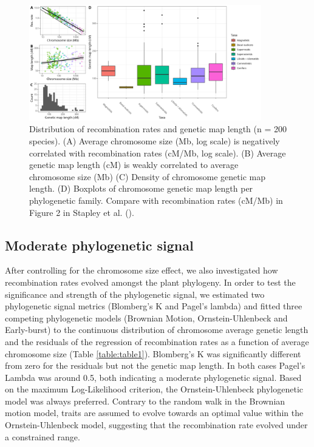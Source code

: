 \documentclass{article}
\begin{document}
\begin{figure}[h!]
  \includegraphics[width=0.9\textwidth]{figures/Fig1.jpeg}
  \centering
  \caption{Distribution of recombination rates and genetic map length  (n = 200 species). (A) Average chromosome size (Mb, log scale) is negatively correlated with recombination rates (cM/Mb, log scale). (B) Average genetic map length (cM) is weakly correlated to average chromosome size (Mb) (C) Density of chromosome genetic map length. (D) Boxplots of chromosome genetic map length per phylogenetic family. Compare with recombination rates (cM/Mb) in Figure 2 in Stapley et al. (\citeyear{stapleyVariationRecombinationFrequency2017}).
  }
  \label{figure:Fig1}
\end{figure}


\subsection*{Moderate phylogenetic signal}


After controlling for the chromosome size effect, we also investigated how recombination rates evolved amongst the plant phylogeny. In order to test the significance and strength of the phylogenetic signal, we estimated two phylogenetic signal metrics (Blomberg’s K and Pagel’s lambda) and fitted three competing phylogenetic models (Brownian Motion, Ornstein-Uhlenbeck and Early-burst) to the continuous distribution of chromosome average genetic length and the residuals of the regression of recombination rates as a function of average chromosome size (Table \ref{table:table1}). Blomberg's K was significantly different from zero for the residuals but not the genetic map length. In both cases Pagel's Lambda was around 0.5, both indicating a moderate phylogenetic signal. Based on the maximum Log-Likelihood criterion, the Ornstein-Uhlenbeck phylogenetic model was always preferred. Contrary to the random walk in the Brownian motion model, traits are assumed to evolve towards an optimal value within the Ornstein-Uhlenbeck model, suggesting that the recombination rate evolved under a constrained range.
\end{document}
